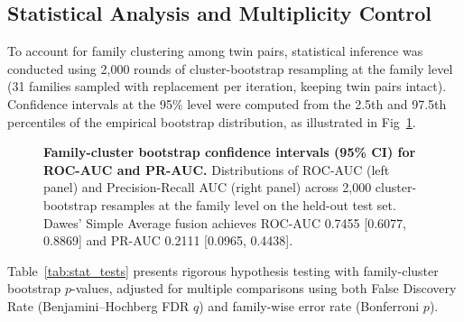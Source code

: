 \documentclass[10pt,letterpaper]{article}
\begin{document}
\subsection*{Statistical Analysis and Multiplicity Control}

To account for family clustering among twin pairs, statistical inference was conducted using 2,000 rounds of cluster-bootstrap resampling at the family level (31 families sampled with replacement per iteration, keeping twin pairs intact). Confidence intervals at the 95\% level were computed from the 2.5th and 97.5th percentiles of the empirical bootstrap distribution, as illustrated in Fig~\ref{fig:ci_barplot}.

\begin{figure}[!h]
\caption{\textbf{Family-cluster bootstrap confidence intervals (95\% CI) for ROC-AUC and PR-AUC.}
Distributions of ROC-AUC (left panel) and Precision-Recall AUC (right panel) across 2,000 cluster-bootstrap resamples at the family level on the held-out test set. Dawes' Simple Average fusion achieves ROC-AUC 0.7455 [0.6077, 0.8869] and PR-AUC 0.2111 [0.0965, 0.4438].}
\label{fig:ci_barplot}
\end{figure}

Table~\ref{tab:stat_tests} presents rigorous hypothesis testing with family-cluster bootstrap $p$-values, adjusted for multiple comparisons using both False Discovery Rate (Benjamini--Hochberg FDR $q$) and family-wise error rate (Bonferroni $p$).
\end{document}

